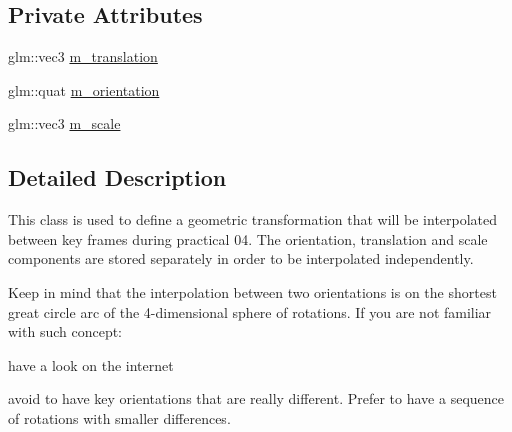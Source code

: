 \subsection*{Private Attributes}
\begin{DoxyCompactItemize}
\item 
glm\+::vec3 \hyperlink{classGeometricTransformation_a8642aa96a78adfdd279b5c4e1d7ee8db}{m\+\_\+translation}
\item 
glm\+::quat \hyperlink{classGeometricTransformation_a9ca739f24f14669c8345c08e15f12488}{m\+\_\+orientation}
\item 
glm\+::vec3 \hyperlink{classGeometricTransformation_ae5cd66123221556e3cfecab07b84339f}{m\+\_\+scale}
\end{DoxyCompactItemize}


\subsection{Detailed Description}
This class is used to define a geometric transformation that will be interpolated between key frames during practical 04. The orientation, translation and scale components are stored separately in order to be interpolated independently.

Keep in mind that the interpolation between two orientations is on the shortest great circle arc of the 4-\/dimensional sphere of rotations. If you are not familiar with such concept\+:
\begin{DoxyItemize}
\item have a look on the internet
\item avoid to have key orientations that are really different. Prefer to have a sequence of rotations with smaller differences. 
\end{DoxyItemize}

